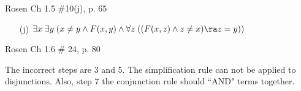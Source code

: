 \begin{questions}
\bonusquestion[1] Rosen Ch 1.5 \#10(j), p. 65
    \ifprintanswers
        \vspace{-12pt}
    \fi
  \begin{solution}
      \begin{itemize}[itemsep=0pt,parsep=0pt,topsep=0pt,partopsep=0pt]
         \item[(j)] $\exists x\; \exists y\; (x \neq y \wedge F(x,y) \wedge \forall z\; ((F(x,z) \wedge z \neq x) \ra z = y))$
      \end{itemize}
  \end{solution}


\bonusquestion[1] Rosen Ch 1.6 \# 24, p. 80
    \ifprintanswers
        \vspace{-15pt}
    \fi
\begin{solution}
    The incorrect steps are 3 and 5.  The simplification rule can not be applied to disjunctions.  Also, step 7 the conjunction rule should ``AND" terms together.
\end{solution}


\end{questions}
